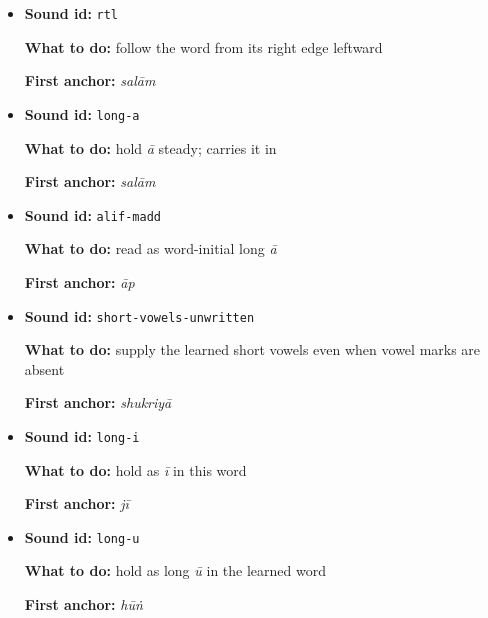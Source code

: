 \begin{itemize}
\raggedright
\setlength{\itemsep}{0.35em}
  \item \begin{minipage}[t]{\linewidth}
  \textbf{Sound id:} \texttt{rtl}
  \par \textbf{What to do:} follow the word from its right edge leftward
  \par \textbf{First anchor:} \textbf{} \emph{salām}
  \end{minipage}
  \item \begin{minipage}[t]{\linewidth}
  \textbf{Sound id:} \texttt{long-a}
  \par \textbf{What to do:} hold \emph{ā} steady; \textbf{} carries it in \textbf{}
  \par \textbf{First anchor:} \textbf{} \emph{salām}
  \end{minipage}
  \item \begin{minipage}[t]{\linewidth}
  \textbf{Sound id:} \texttt{alif-madd}
  \par \textbf{What to do:} read \textbf{} as word-initial long \emph{ā}
  \par \textbf{First anchor:} \textbf{} \emph{āp}
  \end{minipage}
  \item \begin{minipage}[t]{\linewidth}
  \textbf{Sound id:} \texttt{short-vowels-unwritten}
  \par \textbf{What to do:} supply the learned short vowels even when vowel marks are absent
  \par \textbf{First anchor:} \textbf{} \emph{shukriyā}
  \end{minipage}
  \item \begin{minipage}[t]{\linewidth}
  \textbf{Sound id:} \texttt{long-i}
  \par \textbf{What to do:} hold \textbf{} as \emph{ī} in this word
  \par \textbf{First anchor:} \textbf{} \emph{jī}
  \end{minipage}
  \item \begin{minipage}[t]{\linewidth}
  \textbf{Sound id:} \texttt{long-u}
  \par \textbf{What to do:} hold \textbf{} as long \emph{ū} in the learned word
  \par \textbf{First anchor:} \textbf{} \emph{hūṅ}

\end{minipage}
\end{itemize}
